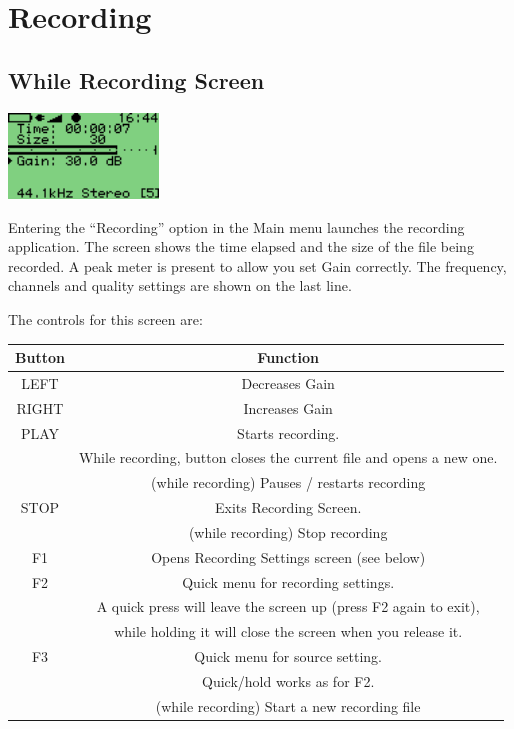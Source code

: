 \section{\label{ref:Recording}Recording}
\subsection{\label{ref:Whilerecordingscreen}While Recording Screen}
\begin{center}
  \includegraphics[width=4cm]{main_menu/images/ss-while-recording-screen-112x64x1.png}
\end{center}
Entering the ``Recording'' option in the Main menu launches the recording application. The screen shows the time elapsed and the size of the file being recorded. A peak meter is present to allow you set Gain correctly.  The frequency, channels and quality settings are shown on the last line.

The controls for this screen are:

\begin{table}[h!]
  \begin{center}
    \begin{tabular}{@{}cc@{}}\toprule
      \textbf{Button} & \textbf{Function} \\\midrule
      LEFT & Decreases Gain \\
      RIGHT & Increases Gain \\
      PLAY & Starts recording.  \\
           & While recording, button closes the current file and opens a new one.\\
           & (while recording) Pauses / restarts recording \\
      STOP & Exits Recording Screen.\\
           & (while recording) Stop recording \\
      F1 & Opens Recording Settings screen (see below) \\
      F2 & Quick menu for recording settings. \\
         & A quick press will leave the screen up (press F2 again to exit),\\
         & while holding it will close the screen when you release it. \\
      F3 & Quick menu for source setting. \\
         & Quick/hold works as for F2. \\
         & (while recording) Start a new recording file \\\bottomrule
    \end{tabular}
  \end{center}
\end{table}


